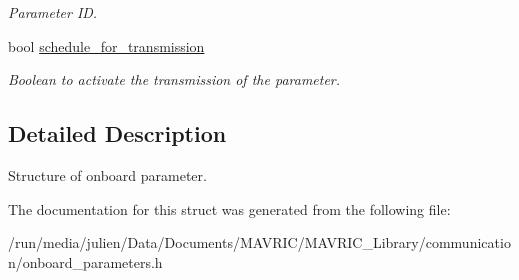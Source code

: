 \begin{DoxyCompactItemize}
\begin{DoxyCompactList}\small\item\em Parameter I\+D. \end{DoxyCompactList}\item 
\hypertarget{structonboard__parameters__entry__t_adfc3118f2ec53f360c29fef8b9a65de3}{bool \hyperlink{structonboard__parameters__entry__t_adfc3118f2ec53f360c29fef8b9a65de3}{schedule\+\_\+for\+\_\+transmission}}\label{structonboard__parameters__entry__t_adfc3118f2ec53f360c29fef8b9a65de3}

\begin{DoxyCompactList}\small\item\em Boolean to activate the transmission of the parameter. \end{DoxyCompactList}\end{DoxyCompactItemize}


\subsection{Detailed Description}
Structure of onboard parameter. 

The documentation for this struct was generated from the following file\+:\begin{DoxyCompactItemize}
\item 
/run/media/julien/\+Data/\+Documents/\+M\+A\+V\+R\+I\+C/\+M\+A\+V\+R\+I\+C\+\_\+\+Library/communication/onboard\+\_\+parameters.\+h\end{DoxyCompactItemize}
